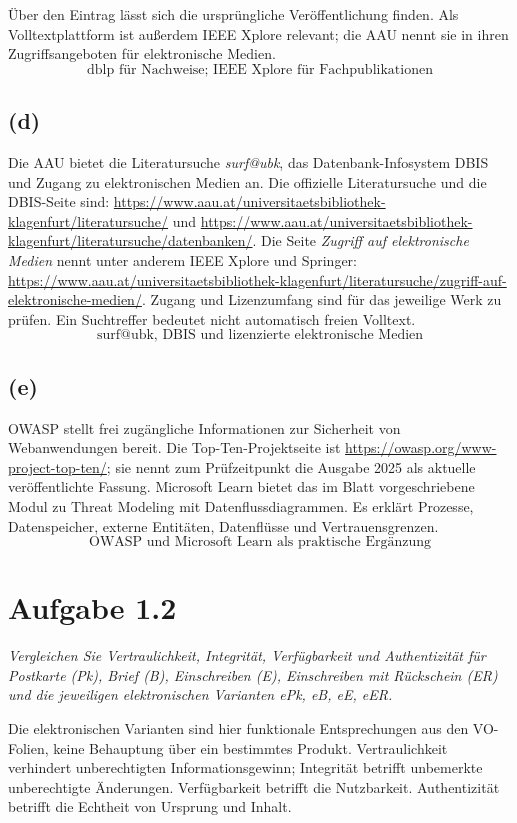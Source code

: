 \documentclass[a4paper,11pt]{article}
\newif\ifexplain
\newcommand{\aufgabe}[1]{\section*{Aufgabe #1}}
\newcommand{\angabe}[1]{\textit{#1}\par\smallskip}
\newcommand{\teil}[1]{\subsection*{(#1)}}
\newcommand{\explain}[1]{\ifexplain\begin{erklbox}#1\end{erklbox}\fi}
\newcommand{\ergebnis}[1]{\[\boxed{\text{#1}}\]}
\begin{document}
Über den Eintrag lässt sich die ursprüngliche Veröffentlichung finden.
Als Volltextplattform ist außerdem IEEE Xplore relevant; die AAU nennt sie in ihren Zugriffsangeboten für elektronische Medien.
\ergebnis{dblp für Nachweise; IEEE Xplore für Fachpublikationen}
\explain{Wir brauchen hier wissenschaftliche Quellen, keine zweite Nachrichtenliste. Bei dblp
finden wir die Veröffentlichung und ihre bibliografischen Angaben. Ob der Volltext zugänglich ist,
prüfen wir anschließend beim Verlag oder über die Bibliothek.}
\teil{d}
Die AAU bietet die Literatursuche \emph{surf@ubk}, das Datenbank-Infosystem DBIS und Zugang zu elektronischen Medien an.
Die offizielle Literatursuche und die DBIS-Seite sind:
\url{https://www.aau.at/universitaetsbibliothek-klagenfurt/literatursuche/} und
\url{https://www.aau.at/universitaetsbibliothek-klagenfurt/literatursuche/datenbanken/}.
Die Seite \emph{Zugriff auf elektronische Medien} nennt unter anderem IEEE Xplore und Springer:
\url{https://www.aau.at/universitaetsbibliothek-klagenfurt/literatursuche/zugriff-auf-elektronische-medien/}.
Zugang und Lizenzumfang sind für das jeweilige Werk zu prüfen. Ein Suchtreffer bedeutet nicht automatisch freien Volltext.
\ergebnis{surf@ubk, DBIS und lizenzierte elektronische Medien}
\explain{Die Suche und das Zugriffsrecht sind zwei verschiedene Dinge. DBIS hilft bei der Auswahl
einer Datenbank, surf@ubk bei der Literatursuche. Für einen konkreten Artikel gelten trotzdem dessen Zugriffsbedingungen.}
\teil{e}
OWASP stellt frei zugängliche Informationen zur Sicherheit von Webanwendungen bereit.
Die Top-Ten-Projektseite ist \url{https://owasp.org/www-project-top-ten/};
sie nennt zum Prüfzeitpunkt die Ausgabe 2025 als aktuelle veröffentlichte Fassung.
Microsoft Learn bietet das im Blatt vorgeschriebene Modul zu Threat Modeling mit Datenflussdiagrammen.
Es erklärt Prozesse, Datenspeicher, externe Entitäten, Datenflüsse und Vertrauensgrenzen.
\ergebnis{OWASP und Microsoft Learn als praktische Ergänzung}
\explain{Diese Seiten ergänzen die anderen Quellen: OWASP hilft bei Webrisiken, Microsoft bei der
Modellierung. Ein konkretes System muss trotzdem einzeln betrachtet werden; eine allgemeine Liste
enthält nicht automatisch jede relevante Bedrohung.}

\aufgabe{1.2}
\angabe{Vergleichen Sie Vertraulichkeit, Integrität, Verfügbarkeit und Authentizität für
Postkarte (Pk), Brief (B), Einschreiben (E), Einschreiben mit Rückschein (ER) und die jeweiligen elektronischen Varianten ePk, eB, eE, eER.}
Die elektronischen Varianten sind hier funktionale Entsprechungen aus den VO-Folien, keine Behauptung über ein bestimmtes Produkt.
Vertraulichkeit verhindert unberechtigten Informationsgewinn; Integrität betrifft unbemerkte unberechtigte Änderungen.
Verfügbarkeit betrifft die Nutzbarkeit. Authentizität betrifft die Echtheit von Ursprung und Inhalt.
\end{document}
